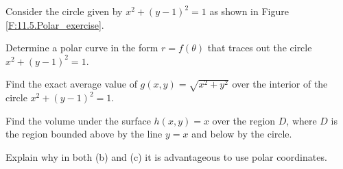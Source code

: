 \begin{activity} \label{A:11.5.5} 
Consider the circle given by $x^2 + (y-1)^2 = 1$ as shown in Figure \ref{F:11.5.Polar_exercise}.

\ba
	\item Determine a polar curve in the form $r = f(\theta)$ that traces out the circle $x^2 + (y-1)^2 = 1$.
	\item Find the exact average value of $g(x,y) = \sqrt{x^2 + y^2}$ over the interior of the circle $x^2 + (y-1)^2 = 1$.
	\item Find the volume under the surface $h(x,y) = x$ over the region $D$, where $D$ is the region bounded above by the line $y=x$ and below by the circle.
	\item Explain why in both (b) and (c) it is advantageous to use polar coordinates. 
\ea



\end{activity}
\begin{smallhint}

\end{smallhint}
\begin{bighint}

\end{bighint}
